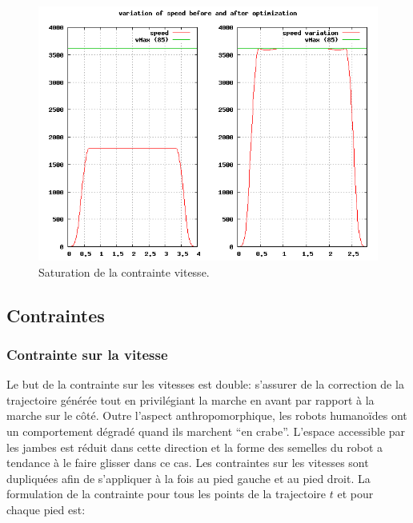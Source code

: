 \begin{figure}[htbp]
  \begin{center}
\includegraphics[width=\linewidth]{src/chap1-roboptim/time-optimization.png}
  \end{center}
  \caption{Saturation de la contrainte vitesse. \label{fig:speed}}
\end{figure}


\subsection{Contraintes}
\label{sec:chap1_roboptim_contraintes}

\subsubsection{Contrainte sur la vitesse}
\label{sec:chap1_roboptim_contraintes_vitesse}

 Le but de la contrainte sur les vitesses
est double: s'assurer de la correction de la trajectoire générée tout
en privilégiant la marche en avant par rapport à la marche sur le
côté. Outre l'aspect anthropomorphique, les robots humanoïdes ont un
comportement dégradé quand ils marchent ``en crabe''. L'espace
accessible par les jambes est réduit dans cette direction et la forme
des semelles du robot a tendance à le faire glisser dans ce cas. Les
contraintes sur les vitesses sont dupliquées afin de s'appliquer à la
fois au pied gauche et au pied droit. La formulation de la contrainte
pour tous les points de la trajectoire $t$ et pour chaque pied est:


